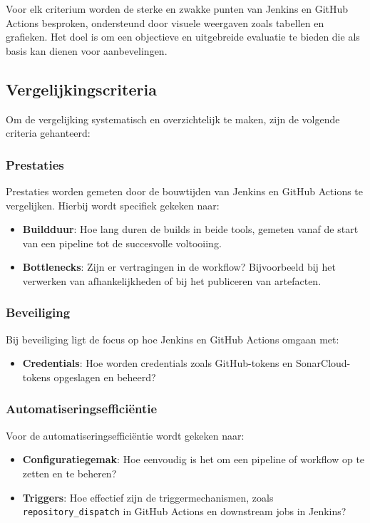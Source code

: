 Voor elk criterium worden de sterke en zwakke punten van Jenkins en GitHub Actions besproken, ondersteund door visuele weergaven zoals tabellen en grafieken. Het doel is om een objectieve en uitgebreide evaluatie te bieden die als basis kan dienen voor aanbevelingen.

\subsection{Vergelijkingscriteria}
Om de vergelijking systematisch en overzichtelijk te maken, zijn de volgende criteria gehanteerd:

\subsubsection{Prestaties}
Prestaties worden gemeten door de bouwtijden van Jenkins en GitHub Actions te vergelijken. Hierbij wordt specifiek gekeken naar:
\begin{itemize}
    \item \textbf{Buildduur}: Hoe lang duren de builds in beide tools, gemeten vanaf de start van een pipeline tot de succesvolle voltooiing.
    \item \textbf{Bottlenecks}: Zijn er vertragingen in de workflow? Bijvoorbeeld bij het verwerken van afhankelijkheden of bij het publiceren van artefacten.
\end{itemize}

\subsubsection{Beveiliging}
Bij beveiliging ligt de focus op hoe Jenkins en GitHub Actions omgaan met:
\begin{itemize}
    \item \textbf{Credentials}: Hoe worden credentials zoals GitHub-tokens en SonarCloud-tokens opgeslagen en beheerd?
\end{itemize}

\subsubsection{Automatiseringsefficiëntie}
Voor de automatiseringsefficiëntie wordt gekeken naar:
\begin{itemize}
    \item \textbf{Configuratiegemak}: Hoe eenvoudig is het om een pipeline of workflow op te zetten en te beheren?
    \item \textbf{Triggers}: Hoe effectief zijn de triggermechanismen, zoals \texttt{repository\_dispatch} in GitHub Actions en downstream jobs in Jenkins?
\end{itemize}

